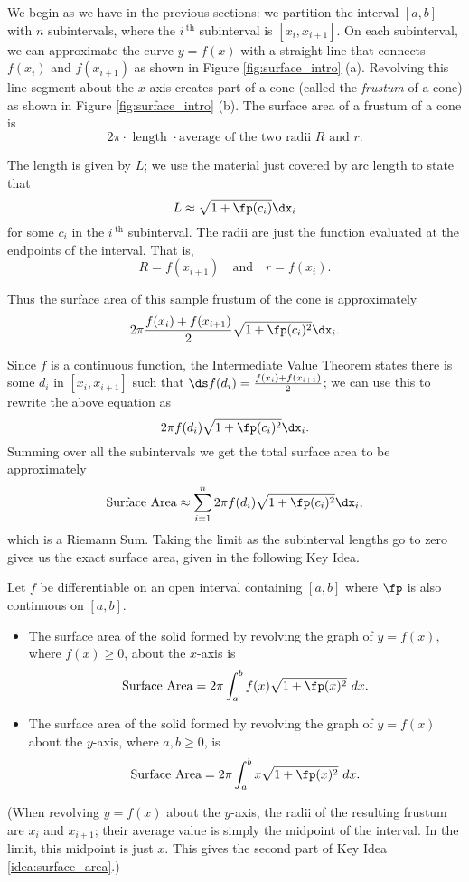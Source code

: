 We begin as we have in the previous sections: we partition the interval $[a,b]$ with $n$ subintervals, where the $i\,^{\text{th}}$ subinterval is $[x_i,x_{i+1}]$. On each subinterval, we can approximate the curve $y=f(x)$ with a straight line that connects $f(x_i)$ and $f(x_{i+1})$ as shown in Figure \ref{fig:surface_intro} (a). Revolving this line segment about the $x$-axis creates part of a cone (called the \textit{frustum} of a cone) as shown in Figure \ref{fig:surface_intro} (b). The surface area of a frustum of a cone is $$2\pi\cdot\text{ length }\cdot\text{average of the two radii $R$ and $r$}.$$

The length is given by $L$; we use the material just covered by arc length to state that $$L\approx \sqrt{1+\fp(c_i)}\dx_i$$ for some $c_i$ in the $i\,^\text{th}$ subinterval. The radii are just the function evaluated at the endpoints of the interval. That is, $$R = f(x_{i+1})\quad \text{and}\quad r = f(x_i).$$

Thus the surface area of this sample frustum of the cone is approximately 
$$2\pi\frac{f(x_i)+f(x_{i+1})}2\sqrt{1+\fp(c_i)^2}\dx_i.$$

Since $f$ is a continuous function, the Intermediate Value Theorem states there is some $d_i$ in $[x_i,x_{i+1}]$ such that $\ds f(d_i) = \frac{f(x_i)+f(x_{i+1})}2$; we can use this to rewrite the above equation as
$$2\pi f(d_i)\sqrt{1+\fp(c_i)^2}\dx_i.$$
Summing over all the subintervals we get the total surface area to be approximately 
$$\text{Surface Area}\approx \sum_{i=1}^n 2\pi f(d_i)\sqrt{1+\fp(c_i)^2}\dx_i,$$
which is a Riemann Sum. Taking the limit as the subinterval lengths go to zero gives us the exact surface area, given in the following Key Idea.

{Let $f$ be differentiable on an open interval containing $[a,b]$ where $\fp$ is also continuous on $[a,b]$. 
	\begin{itemize}
	\item	The surface area of the solid formed by revolving the graph of $y=f(x)$, where $f(x)\geq0$, about the $x$-axis is
	$$\text{Surface Area} = 2\pi\int_a^b f(x)\sqrt{1+\fp(x)^2}\ dx.$$
	\item	The surface area of the solid formed by revolving the graph of $y=f(x)$ about the $y$-axis, where $a,b\geq0$, is
	$$\text{Surface Area} = 2\pi\int_a^b x\sqrt{1+\fp(x)^2}\ dx.$$
	\end{itemize}
}

(When revolving $y=f(x)$ about the $y$-axis, the radii of the resulting frustum are $x_i$ and $x_{i+1}$; their average value is simply the midpoint of the interval. In the limit, this midpoint is just $x$. This gives the second part of Key Idea \ref{idea:surface_area}.)\\

